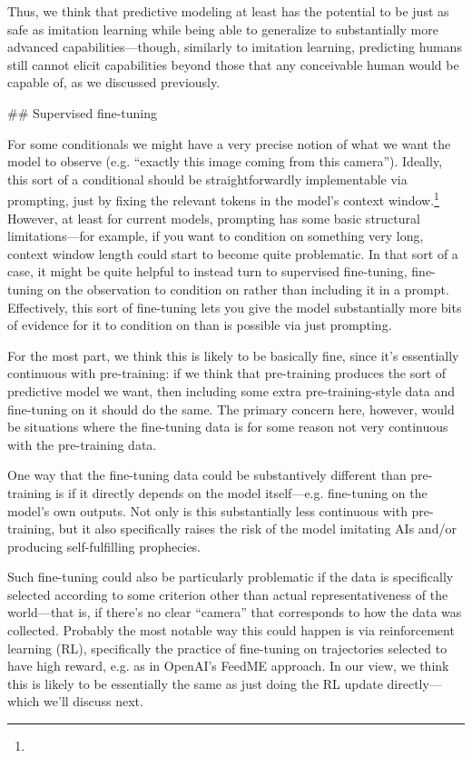 {Thus, we think that predictive modeling at least has the potential to be just as safe as imitation learning while being able to generalize to substantially more advanced capabilities---though, similarly to imitation learning, predicting humans still cannot elicit capabilities beyond those that any conceivable human would be capable of, as we discussed previously\cite{TODO: cite TODO}.


## Supervised fine-tuning

For some conditionals we might have a very precise notion of what we want the model to observe (e.g. ``exactly this image coming from this camera''). Ideally, this sort of a conditional should be straightforwardly implementable via prompting, just by fixing the relevant tokens in the model's context window.\footnote{} However, at least for current models, prompting has some basic structural limitations---for example, if you want to condition on something very long, context window length could start to become quite problematic. In that sort of a case, it might be quite helpful to instead turn to supervised fine-tuning, fine-tuning on the observation to condition on rather than including it in a prompt. Effectively, this sort of fine-tuning lets you give the model substantially more bits of evidence for it to condition on than is possible via just prompting.

For the most part, we think this is likely to be basically fine, since it's essentially continuous with pre-training: if we think that pre-training produces the sort of predictive model we want, then including some extra pre-training-style data and fine-tuning on it should do the same. The primary concern here, however, would be situations where the fine-tuning data is for some reason not very continuous with the pre-training data.

One way that the fine-tuning data could be substantively different than pre-training is if it directly depends on the model itself---e.g. fine-tuning on the model's own outputs. Not only is this substantially less continuous with pre-training, but it also specifically raises the risk of the model imitating AIs and/or producing self-fulfilling prophecies.

Such fine-tuning could also be particularly problematic if the data is specifically selected according to some criterion other than actual representativeness of the world---that is, if there's no clear ``camera'' that corresponds to how the data was collected. Probably the most notable way this could happen is via reinforcement learning (RL), specifically the practice of fine-tuning on trajectories selected to have high reward, e.g. as in OpenAI's FeedME approach\cite{TODO: cite https://beta.openai.com/docs/model-index-for-researchers}. In our view, we think this is likely to be essentially the same as just doing the RL update directly---which we'll discuss next.


}
